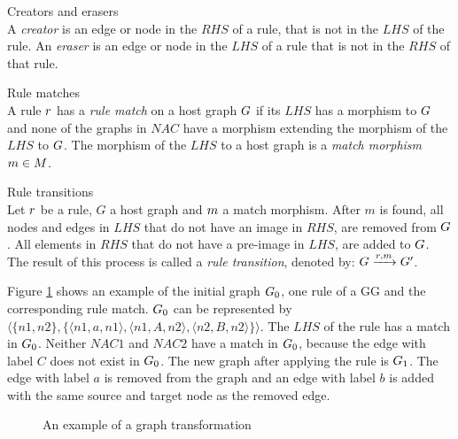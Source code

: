 \begin{definition} Creators and erasers \\
A \textit{creator} is an edge or node in the $\mathit{RHS}$ of a rule, that is not in the $\mathit{LHS}$ of the rule. An \textit{eraser} is an edge or node in the $\mathit{LHS}$ of a rule that is not in the $\mathit{RHS}$ of that rule.
\end{definition}

\vspace{10px}
\begin{definition} Rule matches \\
A rule $r$ has a \textit{rule match} on a host graph $G$ if its $\mathit{LHS}$ has a morphism to $G$ and none of the graphs in $\mathit{NAC}$ have a morphism extending the morphism of the $\mathit{LHS}$ to $G$. The morphism of the $\mathit{LHS}$ to a host graph is a \textit{match morphism} $m \in M$.
\end{definition}

\vspace{10px}
\begin{definition} Rule transitions \\
Let $r$ be a rule, $G$ a host graph and $m$ a match morphism. After $m$ is found, all nodes and edges in $\mathit{LHS}$ that do not have an image in $\mathit{RHS}$, are removed from $G$. All elements in $\mathit{RHS}$ that do not have a pre-image in $\mathit{LHS}$, are added to $G$. The result of this process is called a \textit{rule transition}, denoted by: $G \xrightarrow{r, m}G'$.
\end{definition}
\vspace{10px}

Figure \ref{fig:gg_example} shows an example of the initial graph $G_0$, one rule of a GG and the corresponding rule match. $G_0$ can be represented by $\langle\{n1,n2\},\{\langle n1,a,n1\rangle, \langle n1,A,n2\rangle,\langle n2,B,n2\rangle\}\rangle$. The $\mathit{LHS}$ of the rule has a match in $G_0$. Neither $\mathit{NAC1}$ and $\mathit{NAC2}$ have a match in $G_0$, because the edge with label $C$ does not exist in $G_0$. The new graph after applying the rule is $G_1$. The edge with label $a$ is removed from the graph and an edge with label $b$ is added with the same source and target node as the removed edge.

\begin{figure}[ht]
  \begin{center}
    
  \end{center}
  \caption{An example of a graph transformation}
  \label{fig:gg_example}
\end{figure}

